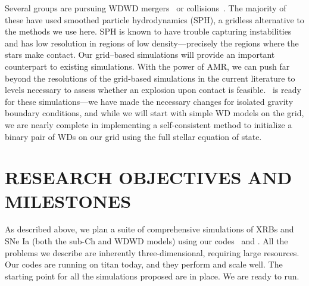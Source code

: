 \documentclass[11pt,letterpaper,english]{article}
\begin{document}
Several groups are pursuing WDWD
mergers~\cite{yoon:2007,motl:2007,loren-aguilar:2009,shenetal+11} or
collisions~\cite{raskinetal+10,loren-aguilar:2010,rosswog:2009}. The
majority of these have used smoothed particle hydrodynamics (SPH), a
gridless alternative to the methods we use here.  SPH is known to have
trouble capturing instabilities and has low resolution in regions of
low density---precisely the regions where the stars make contact.  Our
grid--based simulations will provide an important counterpart to
existing simulations.  With the power of AMR, we can push far beyond
the resolutions of the grid-based simulations in the current
literature to levels necessary to assess whether an explosion upon
contact is feasible. \castro\ is ready for these simulations---we have
made the necessary changes for isolated gravity boundary conditions,
and while we will start with simple WD models on the grid, we are
nearly complete in implementing a self-consistent method to initialize a binary
pair of WDs on our grid using the full stellar equation of state.



\section{RESEARCH OBJECTIVES AND MILESTONES }  


As described above, we plan a suite of comprehensive simulations of
XRBs and SNe Ia (both the sub-Ch and WDWD models) using our
codes \maestro\ and \castro.  All the problems we
describe are inherently three-dimensional, requiring large resources.
Our codes are running on titan today, and they perform and scale
well.  The starting point for all the simulations proposed are in
place.  We are ready to run.
\end{document}
